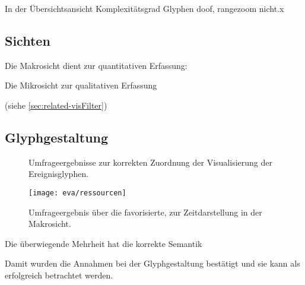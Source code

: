 In der Übersichtsansicht Komplexitätsgrad Glyphen doof, rangezoom nicht.x




\subsection*{Sichten}
Die Makrosicht dient zur quantitativen Erfassung:

Die Mikrosicht zur qualitativen Erfassung 

(siehe \autoref{sec:related-visFilter})


\subsection*{Glyphgestaltung}
\begin{figure}
	{\caption{Umfrageergebnisse zur korrekten Zuordnung der Visualisierung der Ereignisglyphen.}\label{fig:eva:ereignis}}
\end{figure}

\begin{figure}
	\texttt{[image: eva/ressourcen]}
	\caption{Umfrageergebnis über die favorisierte,  zur Zeitdarstellung in der Makrosicht.}\label{fig:eva:ressourcen}
\end{figure}

Die überwiegende Mehrheit hat die korrekte Semantik 

Damit wurden die Annahmen bei der Glyphgestaltung bestätigt und sie kann als erfolgreich betrachtet werden.

